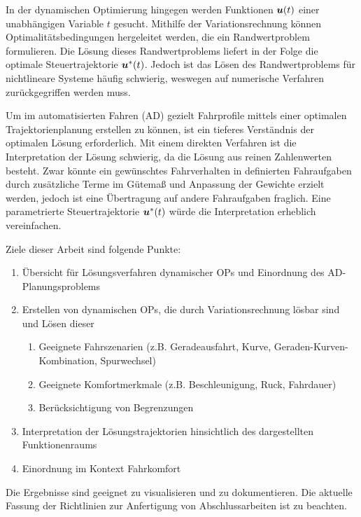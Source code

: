 In der dynamischen Optimierung hingegen werden Funktionen $\boldsymbol{u}(t)$ einer unabhängigen Variable $t$ gesucht. 
Mithilfe der Variationsrechnung können Optimalitätsbedingungen hergeleitet werden, die ein Randwertproblem formulieren. 
Die Lösung dieses Randwertproblems liefert in der Folge die optimale Steuertrajektorie ${\boldsymbol{u}}^*(t)$. 
Jedoch ist das Lösen des Randwertproblems für nichtlineare Systeme häufig schwierig, weswegen auf numerische Verfahren zurückgegriffen werden muss.

Um im automatisierten Fahren (AD) gezielt Fahrprofile mittels einer optimalen Trajektorienplanung erstellen zu können, ist ein tieferes Verständnis der optimalen Lösung erforderlich. 
Mit einem direkten Verfahren ist die Interpretation der Lösung schwierig, da die Lösung aus reinen Zahlenwerten besteht. 
Zwar könnte ein gewünschtes Fahrverhalten in definierten Fahraufgaben durch zusätzliche Terme im Gütemaß und Anpassung der Gewichte erzielt werden, jedoch ist eine Übertragung auf andere Fahraufgaben fraglich. 
Eine parametrierte Steuertrajektorie ${\boldsymbol{u}}^*(t)$ würde die Interpretation erheblich vereinfachen.


Ziele dieser Arbeit sind folgende Punkte:
\begin{enumerate}
	\item Übersicht für Lösungsverfahren dynamischer OPs und Einordnung des AD-Planungsproblems
	\item Erstellen von dynamischen OPs, die durch Variationsrechnung lösbar sind und Lösen dieser
	\begin{enumerate}
		\item Geeignete Fahrszenarien (z.B. Geradeausfahrt, Kurve, Geraden-Kurven-Kombination, Spurwechsel)
		\item Geeignete Komfortmerkmale (z.B. Beschleunigung, Ruck, Fahrdauer)
		\item Berücksichtigung von Begrenzungen
	\end{enumerate}
	\item Interpretation der Lösungstrajektorien hinsichtlich des dargestellten Funktionenraums 
	\item Einordnung im Kontext Fahrkomfort
\end{enumerate}

Die Ergebnisse sind geeignet zu visualisieren und zu dokumentieren. Die aktuelle Fassung der Richtlinien zur Anfertigung von Abschlussarbeiten ist zu beachten.


%
%
%

